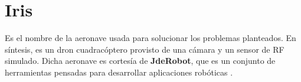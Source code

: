 \section{Iris}
\label{sec:iris}

Es el nombre de la aeronave usada para solucionar los problemas planteados. En síntesis, es un dron cuadracóptero provisto de una cámara y un sensor de \ac{RF} simulado. Dicha aeronave es cortesía de \textbf{JdeRobot}, que es un conjunto de herramientas pensadas para desarrollar aplicaciones robóticas \cite{jderobot-ref}.\\